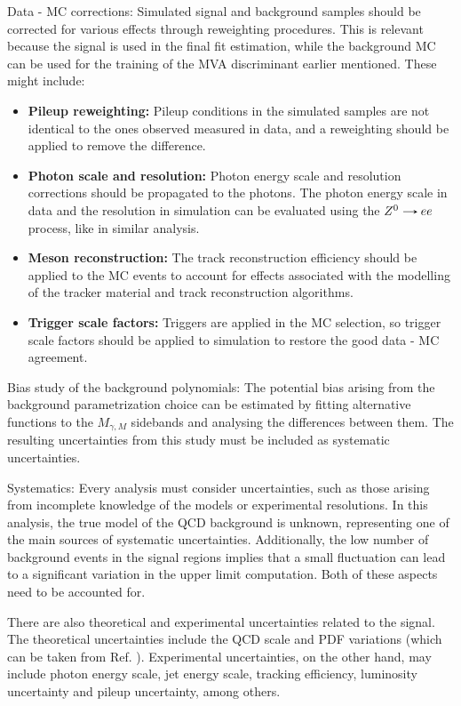 \begin{myitemlist}
{    \item[Data - MC corrections:] Simulated signal and background samples should be corrected for various effects through reweighting procedures. This is relevant because the signal is used in the final fit estimation, while the background MC can be used for the training of the MVA discriminant earlier mentioned. These might include:
    \begin{itemize}
        \item {\bf Pileup reweighting:} Pileup conditions in the simulated samples are not identical to the ones observed measured in data, and a reweighting should be applied to remove the difference.
        \item {\bf Photon scale and resolution:} Photon energy scale and resolution corrections should be propagated to the photons. The photon energy scale in data and the resolution in simulation can be evaluated using the $Z^{0}\decaysto ee$ process, like in similar analysis.
        \item {\bf Meson reconstruction:} The track reconstruction efficiency should be applied to the MC events to account for effects associated with the modelling of the tracker material and track reconstruction algorithms.
        \item {\bf Trigger scale factors:} Triggers are applied in the MC selection, so trigger scale factors should be applied to simulation to restore the good data - MC agreement. 
    \end{itemize}
    }
\fi
    \item[Bias study of the background polynomials:] The potential bias arising from the background parametrization choice can be estimated by fitting alternative functions to the $M_{\gamma, M}$ sidebands and analysing the differences between them. The resulting uncertainties from this study must be included as systematic uncertainties.

    \item[Systematics:] Every analysis must consider uncertainties, such as those arising from incomplete knowledge of the models or experimental resolutions. In this analysis, the true model of the QCD background is unknown, representing one of the main sources of systematic uncertainties. Additionally, the low number of background events in the signal regions implies that a small fluctuation can lead to a significant variation in the upper limit computation. Both of these aspects need to be accounted for.
    
    There are also theoretical and experimental uncertainties related to the signal. The theoretical uncertainties include the QCD scale and PDF variations (which can be taken from Ref. \cite{LHCHiggsCrossSectionWorkingGroup:2016ypw}). Experimental uncertainties, on the other hand, may include photon energy scale, jet energy scale, tracking efficiency, luminosity uncertainty and pileup uncertainty, among others.
    

\end{myitemlist}
